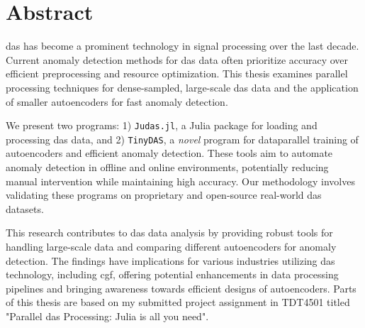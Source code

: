 \chapter*{Abstract}

\acrfull{das} has become a prominent technology in signal processing over the last decade. Current anomaly detection methods for \acrshort{das} data often prioritize accuracy over efficient preprocessing and resource optimization. This thesis examines parallel processing techniques for dense-sampled, large-scale \acrshort{das} data and the application of smaller autoencoders for fast anomaly detection.

We present two programs: 1) \texttt{Judas.jl}, a Julia package for loading and processing \acrshort{das} data, and 2) \texttt{TinyDAS}, a \textit{novel} program for dataparallel training of autoencoders and efficient anomaly detection. These tools aim to automate anomaly detection in offline and online environments, potentially reducing manual intervention while maintaining high accuracy. Our methodology involves validating these programs on proprietary and open-source real-world \acrshort{das} datasets.

This research contributes to \acrshort{das} data analysis by providing robust tools for handling large-scale data and comparing different autoencoders for anomaly detection. The findings have implications for various industries utilizing \acrshort{das} technology, including \acrfull{cgf}, offering potential enhancements in data processing pipelines and bringing awareness towards efficient designs of autoencoders. Parts of this thesis are based on my submitted project assignment in TDT4501 titled "Parallel \acrshort{das} Processing: Julia is all you need".